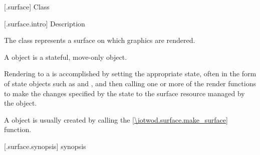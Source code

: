  [\iotwod.surface] {Class }

 [\iotwod.surface.intro] { Description}

\pnum
{}%
The  class represents a surface on which graphics are rendered.

\pnum
A  object is a stateful, move-only object.

\pnum
Rendering to a  is accomplished by setting the appropriate state, often in the form of state objects such as  and , and then calling one or more of the render functions to make the changes specified by the state to the surface resource managed by the  object.

\pnum
A  object is usually created by calling the  \ref{\iotwod.surface.make_surface} function.

 [\iotwod.surface.synopsis] { synopsis}

